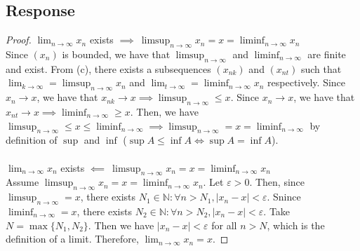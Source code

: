 \documentclass[13pt]{article}
\begin{document}
\subsection*{Response}
\begin{proof}
  $\lim_{n \rightarrow \infty} x_n$ exists $\implies \ \limsup_{n \rightarrow \infty}
  x_n = x = \liminf_{n \rightarrow \infty} x_n$ \\
  Since $(x_n)$ is bounded, we have that
  $\limsup_{n \rightarrow \infty}$ and $\liminf_{n \rightarrow
    \infty}$ are finite and exist. From (c), there exists a
  subsequences $(x_{nk})$ and $(x_{nt})$ such that $\lim_{k
    \rightarrow \infty} = \limsup_{n \rightarrow \infty} x_n$ and $\lim_{t
    \rightarrow \infty} = \liminf_{n \rightarrow \infty} x_n$
  respectively. Since $x_n \rightarrow x$, we have that $x_{nk}
  \rightarrow x \implies \limsup_{n \rightarrow \infty} \leq
  x$. Since $x_n \rightarrow x$, we have that $x_{nt}
  \rightarrow x \implies \liminf_{n \rightarrow \infty} \geq x$. Then,
  we have $\limsup_{n \rightarrow \infty} \leq x \leq \liminf_{n
    \rightarrow \infty} \implies \limsup_{n
    \rightarrow \infty} = x = \liminf_{n \rightarrow \infty}$ by
  definition of $\sup$ and $\inf$ ($\sup{A} \leq \inf{A} \iff \sup{A}
  = \inf{A}$). \\ \\
  $\lim_{n \rightarrow \infty} x_n$ exists $\impliedby \ \limsup_{n \rightarrow \infty}
  x_n = x = \liminf_{n \rightarrow \infty} x_n$ \\
  Assume $\limsup_{n \rightarrow \infty} x_n = x = \liminf_{n
    \rightarrow \infty} x_n$. Let $\varepsilon > 0$. Then, since
  $\limsup_{n \rightarrow \infty} = x$, there exists $N_1 \in
  \mathbb{N} : \forall n > N_1, |x_n - x| < \varepsilon$. Snince
  $\liminf_{n \rightarrow \infty} = x$, there exists $N_2 \in
  \mathbb{N} : \forall n > N_2, |x_n - x| < \varepsilon$. Take $N =
  \max{\{N_1, N_2\}}$. Then we have $|x_n - x| < \varepsilon$ for all
  $n > N$, which is the definition of a limit. Therefore, $\lim_{n
    \rightarrow \infty} x_n = x$.
\end{proof}
\end{document}
